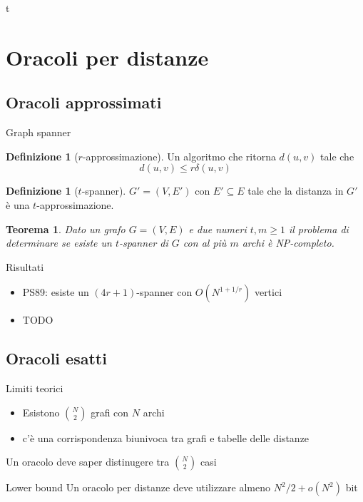 t \documentclass{beamer}
\newcounter{counter1}
\theoremstyle{plain}
\newtheorem{myteo}[counter1]{Teorema}
\theoremstyle{definition}
\newtheorem{mydef}[counter1]{Definizione}
\theoremstyle{remark}
\newcommand{\pa}[1]{\left(#1\right)}
\begin{document}
\section{Oracoli per distanze}

\subsection{Oracoli approssimati}

\begin{frame}{Graph spanner}
  \begin{mydef}[$r$-approssimazione]
    Un algoritmo che ritorna $d(u,v)$ tale che
    \[ d\pa{u,v} \le r \delta\pa{u,v} \]
  \end{mydef}

  \begin{mydef}[$t$-spanner]
    $G' = (V,E')$ con $E' \subseteq E$ tale che la distanza in $G'$
    \`e una $t$-approssimazione.
  \end{mydef}

  \begin{myteo}
    Dato un grafo $G = (V,E)$ e due numeri $t,m\ge 1$ il problema di
    determinare se esiste un $t$-spanner di $G$ con al pi\`u $m$ archi
    \`e NP-completo.
  \end{myteo}
\end{frame}

\begin{frame}{Risultati}
  \begin{itemize}
  \item PS89: esiste un $(4r+1)$-spanner con $O(N^{1+1/r})$ vertici
  \item TODO
  \end{itemize}
\end{frame}

\subsection{Oracoli esatti}

\begin{frame}{Limiti teorici}
  \begin{itemize}
  \item Esistono $\binom{ N}{2}$ grafi con $N$ archi
  \item c'\`e una corrispondenza biunivoca tra grafi e tabelle delle
    distanze 
  \end{itemize}
  \pause
  \vfill
  Un oracolo deve saper distinugere tra $\binom{ N}{2}$ casi
  \pause
  \begin{block}{Lower bound}
    Un oracolo per distanze deve utilizzare almeno $N^2 / 2 + o(N^2)$
    bit
  \end{block}
\end{frame}
\end{document}
